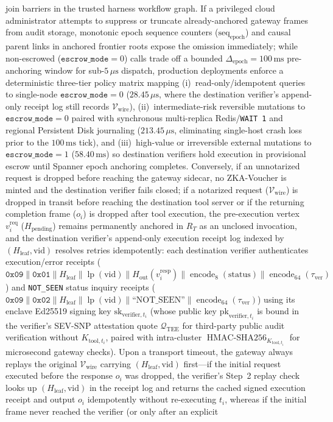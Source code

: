 \documentclass[conference,10pt]{IEEEtran}
\begin{document}
join barriers in the trusted harness workflow graph. If a privileged cloud administrator attempts to suppress or truncate already-anchored gateway frames from audit storage, monotonic epoch sequence counters ($\text{seq}_{\text{epoch}}$) and causal parent links in anchored frontier roots expose the omission immediately; while non-escrowed ($\texttt{escrow\_mode} = 0$) calls trade off a bounded $\Delta_{\text{epoch}} = 100\,\text{ms}$ pre-anchoring window for sub-$5\,\mu\text{s}$ dispatch, production deployments enforce a deterministic three-tier policy matrix mapping (i)~read-only/idempotent queries to single-node $\texttt{escrow\_mode} = 0$ ($28.45\,\mu\text{s}$, where the destination verifier's append-only receipt log still records $\mathcal{V}_{\text{wire}}$), (ii)~intermediate-risk reversible mutations to $\texttt{escrow\_mode} = 0$ paired with synchronous multi-replica Redis/\texttt{WAIT 1} and regional Persistent Disk journaling ($213.45\,\mu\text{s}$, eliminating single-host crash loss prior to the $100\,\text{ms}$ tick), and (iii)~high-value or irreversible external mutations to $\texttt{escrow\_mode} = 1$ ($58.40\,\text{ms}$) so destination verifiers hold execution in provisional escrow until Spanner epoch anchoring completes. Conversely, if an unnotarized request is dropped before reaching the gateway sidecar, no ZKA-Voucher is minted and the destination verifier fails closed; if a notarized request ($\mathcal{V}_{\text{wire}}$) is dropped in transit before reaching the destination tool server or if the returning completion frame ($o_i$) is dropped after tool execution, the pre-execution vertex $v_i^{\text{req}}$ ($H_{\text{pending}}$) remains permanently anchored in $R_T$ as an unclosed invocation, and the destination verifier's append-only execution receipt log indexed by $(H_{\text{leaf}}, \text{vid})$ resolves retries idempotently: each destination verifier authenticates execution/error receipts ($\mathtt{0x09} \parallel \mathtt{0x01} \parallel H_{\text{leaf}} \parallel \operatorname{lp}(\text{vid}) \parallel H_{\text{out}}(v_i^{\text{resp}}) \parallel \operatorname{encode}_8(\text{status}) \parallel \operatorname{encode}_{64}(\tau_{\text{ver}})$) and \texttt{NOT\_SEEN} status inquiry receipts ($\mathtt{0x09} \parallel \mathtt{0x02} \parallel H_{\text{leaf}} \parallel \operatorname{lp}(\text{vid}) \parallel \text{``NOT\_SEEN''} \parallel \operatorname{encode}_{64}(\tau_{\text{ver}})$) using its enclave Ed25519 signing key $\text{sk}_{\text{verifier}, t_i}$ (whose public key $\text{pk}_{\text{verifier}, t_i}$ is bound in the verifier's SEV-SNP attestation quote $\mathcal{Q}_{\text{TEE}}$ for third-party public audit verification without $K_{\text{tool}, t_i}$, paired with intra-cluster $\operatorname{HMAC-SHA256}_{K_{\text{tool}, t_i}}$ for microsecond gateway checks). Upon a transport timeout, the gateway always replays the original $\mathcal{V}_{\text{wire}}$ carrying $(H_{\text{leaf}}, \text{vid})$ first---if the initial request executed before the response $o_i$ was dropped, the verifier's Step~2 replay check looks up $(H_{\text{leaf}}, \text{vid})$ in the receipt log and returns the cached signed execution receipt and output $o_i$ idempotently without re-executing $t_i$, whereas if the initial frame never reached the verifier (or only after an explicit 
\end{document}

